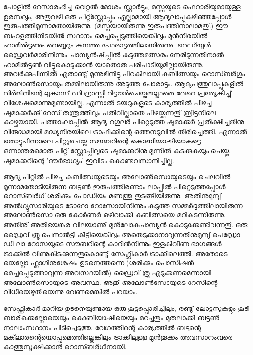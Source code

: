 പോളില്‍ റേസാരംഭിച്ച വെറ്റല്‍ മോശം സ്റ്റാര്‍ട്ടും, മസ്സയുടെ ഫെറാരിയുമായുള്ള ഉരസലും, അതുവഴി ഒരു പിറ്റ്സ്റ്റോപ്പും എല്ലാമായി 
ആദ്യലാപ്പുകഴിഞ്ഞപ്പോള്‍ ഇരുപത്തിമൂന്നാമതായിരുന്നു. (മസ്സയായിരുന്നു ഇരുപത്തിനാലാമതു്.) ഈ ബഹളത്തിനിടയില്‍ സ്ഥാനം 
മെച്ചപ്പെടുത്തിയെങ്കിലും മുന്‍നിരയില്‍ ഹാമില്‍ട്ടണും വെബ്ബറും കനത്ത പോരാട്ടത്തിലായിരുന്നു. റെഡ്ബുള്‍ ഡ്രൈവര്‍മാരിനിന്നും
 ചാമ്പ്യന്‍ഷിപ്പില്‍ കടുത്തമത്സരം നേരിടുന്നതിനാല്‍ ഹാമില്‍ട്ടണ്‍ വിട്ടുകൊടുക്കാന്‍ യാതൊരു പരിപാടിയുമില്ലായിരുന്നു. അവര്‍ക്കുപിന്നില്‍ 
 എതാണ്ടു് മൂന്നുമിനിട്ടു പിറകിലായി കുബിത്സയും റൊസ്ബര്‍ഗും അലോണ്‍സൊയും തമ്മിലായിരുന്നു അടുത്ത പോരാട്ടം. 
 ആദ്യപത്തുലാപ്പുകളില്‍ വിര്‍ജിനിന്റെ ലൂകാസ് ഡി ഗ്രാസ്സി റിട്ടയര്‍ചെയ്തതല്ലാതെ വേറെ പ്രത്യേകിച്ചു് വിശേഷമൊന്നുമുണ്ടായില്ല. 
 എന്നാല്‍ ടയറുകളുടെ കാര്യത്തില്‍ പിഴച്ച ഷുമാക്കര്‍ക്കു് റേസ് തന്ത്രത്തിലും പതിവില്ലാതെ പിഴയ്ക്കുന്നതു് ബ്രിട്ടനിലെ കാഴ്ചയായി. 
 പത്താംലാപ്പില്‍ ആദ്യ റഗുലര്‍ പിറ്റെടുത്ത ഷുമാക്കര്‍ പ്രതീക്ഷിച്ചതിനു വിരുദ്ധമായി മദ്ധ്യനിരയിലെ ട്രാഫിക്കിന്റെ ഒത്തനടുവില്‍ 
 തിരിച്ചെത്തി. എന്നാല്‍ തൊട്ടുപിന്നാലെ പിറ്റുചെയ്ത സൗബറിന്റെ കൊബിയാഷിയാകട്ടെ ഒന്നാന്തരമൊരു പിറ്റ് സ്റ്റോപ്പിലൂടെ 
 ഷുമാക്കറിനു മുന്നില്‍ കടക്കുകയും ചെയ്തു. ഷുമാക്കറിന്റെ 'ദൗര്‍ഭാഗ്യം' ഇവിടം കൊണ്ടവസാനിച്ചില്ല.

ആദ്യ പിറ്റില്‍ പിഴച്ച കുബിത്സയുടെയും അലോണ്‍സൊയുടെയും ചെലവില്‍ മൂന്നാമതോടിയിരുന്ന ബട്ടണ്‍ ഇരുപത്തിരണ്ടാം ലാപ്പില്‍ 
പിറ്റെടുത്തപ്പോള്‍ റൊസ്ബര്‍ഗ് ശരിക്കും പോഡിയം മണത്തു തുടങ്ങിയിരുന്നു. അതിനുമുമ്പു് അല്‍ഗ്യുസാരിയുടെ ടോറോ റോസോയിനിന്നും കടുത്ത സമ്മര്‍ദ്ദത്തിലായിരുന്ന അലോണ്‍സൊ ഒരു കോര്‍ണര്‍ ഒഴിവാക്കി കുബിത്സയെ മറികടന്നിരുന്നു. അതിനു് അതിഭയങ്കര 
വിലയാണു് മുന്‍ലോകചാമ്പ്യന്‍ കൊടുക്കേണ്ടിവന്നതു്. ഒരു ഡ്രൈവ് ത്രൂ പെനാല്‍ട്ടി കിട്ടിയെങ്കിലും അതെടുക്കാനാവുന്നതിനുമുമ്പു് 
പെഡ്രോ ഡി ലാ റോസയുടെ സൗബറിന്റെ കാറില്‍നിന്നും ഇളകിവീണ ഭാഗങ്ങള്‍ ട്രാക്കില്‍ വീണുകിടക്കുന്നതുകൊണ്ടു് സേഫ്റ്റികാര്‍ 
ട്രാക്കിലെത്തി. അതോടെ യെല്ലോ ഫ്ലാഗിനുശേഷം ഉടനെത്തന്നെ (ശരിക്കും പൊസിഷന്‍ മെച്ചപ്പെടുത്താവുന്ന അവസ്ഥയില്‍) 
ഡ്രൈവ് ത്രൂ എടുക്കണമെന്നായി അലോണ്‍സൊയുടെ അവസ്ഥ. അതു് അലോണ്‍സോയുടെ റേസിന്റെ വിധീയെഴുതിയെന്നു വേണമെങ്കില്‍ പറയാം.

സേഫ്റ്റികാര്‍ മാറിയ ഉടനെയുണ്ടായ ഒരു കൂട്ടപ്പൊരിച്ചിലും, രണ്ടു് ലോട്ടസുകളും കൂടി ബാരിക്കെല്ലോയെയും കൊബിയാഷിയെയും മറച്ചതും
 മുതലാക്കി ബട്ടണ്‍ നാലാംസ്ഥാനം പിടിച്ചെടുത്തു. വേഗത്തിന്റെ കാര്യത്തില്‍ ബട്ടന്റെ മക്‌ലാരന്റെയൊപ്പമെത്തില്ലെങ്കിലും ട്രാക്കിലുള്ള 
 മുന്‍തൂക്കം അവസാനംവരെ കാത്തുസൂക്ഷിക്കാന്‍ റൊസ്ബര്‍ഗിനായി.

